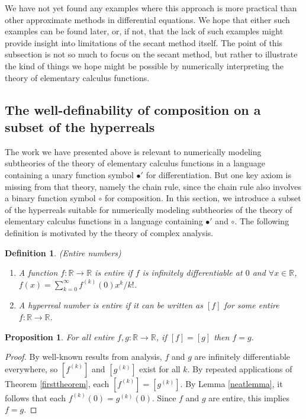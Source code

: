 \documentclass[microtype]{jloganal}
\newtheorem{proposition}[theorem]{Proposition}
\newtheorem{definition}[theorem]{Definition}
\begin{document}
We have not yet found any examples where this approach is more practical
than other approximate methods in differential equations. We hope that
either such examples can be found later, or, if not, that the lack of such
examples might provide insight into limitations of the secant method itself.
The point of this subsection is not so much to focus on the secant
method, but rather to illustrate the kind of things we hope might be
possible by numerically interpreting the theory of elementary calculus
functions.

\subsection{The well-definability of composition on a subset of the hyperreals}
\label{entirenumberssectn}

The work we have presented above is relevant to numerically modeling
subtheories of the theory of elementary calculus functions in a language
containing a unary function symbol $\bullet'$ for differentiation.
But one key axiom is missing from that theory, namely the chain rule,
since the chain rule also involves a binary function symbol $\circ$ for
composition. In this section, we introduce a subset of the hyperreals
suitable for numerically modeling subtheories of the theory of elementary
calculus functions in a language containing $\bullet'$ and $\circ$.
The following definition is motivated by the theory of complex analysis.

\begin{definition}
    (Entire numbers)
    \begin{enumerate}
        \item
        A function $f:\mathbb R\to\mathbb R$ is \emph{entire} if
        $f$ is infinitely differentiable at $0$ and $\forall x\in\mathbb R$,
        $f(x)=\sum_{k=0}^\infty f^{(k)}(0)x^k/k!$.
        \item
        A hyperreal number is \emph{entire} if it can be written as $[f]$
        for some entire $f:\mathbb R\to\mathbb R$.
    \end{enumerate}
\end{definition}

\begin{proposition}
\label{injectivityonentires}
    For all entire $f,g:\mathbb R\to\mathbb R$, if $[f]=[g]$ then $f=g$.
\end{proposition}

\begin{proof}
    By well-known results from analysis, $f$ and $g$ are infinitely
    differentiable everywhere, so $[f^{(k)}]$ and $[g^{(k)}]$ exist
    for all $k$.
    By repeated applications of Theorem \ref{firsttheorem},
    each $[f^{(k)}]=[g^{(k)}]$. By Lemma \ref{neatlemma},
    it follows that each $f^{(k)}(0)=g^{(k)}(0)$.
    Since $f$ and $g$ are entire, this implies $f=g$.
\end{proof}
\end{document}
